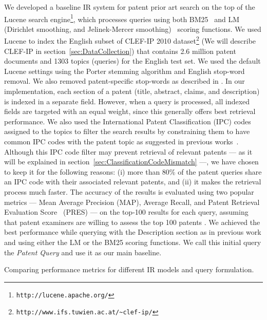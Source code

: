 We developed a baseline IR system for patent prior art search on the top of
the Lucene search engine\footnote{\texttt{http://lucene.apache.org/}}, which processes queries using both BM25~\citep{Robertson1993} and LM (Dirichlet
smoothing, and Jelinek-Mercer smoothing)~\citep{zhai2004study} scoring functions. %
We used Lucene to index the English subset of CLEF-IP 2010 dataset\footnote{\texttt{http://www.ifs.tuwien.ac.at/\textasciitilde{}clef-ip/}} 
(We will describe CLEF-IP in section~\ref{sec:DataCollection}) that contains 2.6 million patent documents and 1303 topics (queries) for the English test set.
We used the default Lucene settings using the Porter stemming algorithm \cite{Porter1980} and English stop-word removal. 
We also removed patent-specific stop-words as described in \cite{magdy2012toward}.
In
our implementation, each section of a patent (title, abstract, claims,
and description) is indexed in a separate field. However, when a query 
is processed, all indexed fields are targeted with an equal weight, since this generally
offers best retrieval performance. We also used the International
Patent Classification (IPC) codes assigned to the topics to filter
the search results by constraining them to have common IPC codes with
the patent topic as suggested in previous works~\citep{lopez2010patatras}.
Although this IPC code filter may prevent retrieval of relevant patents 
--- as it will be explained in section~\ref{sec:ClassificationCodeMismatch} ---, we
have chosen to keep it for the following reasons: (i) more than 80\%
of the patent queries share an IPC code with their associated relevant
patents, and (ii) it makes the retrieval process much faster. The accuracy of the results is evaluated 
using two popular metrics --- Mean Average Precision (MAP), Average Recall, and Patent Retrieval Evaluation 
Score~\citep{magdy2012toward} (PRES) --- on the top-100 results for each query, assuming that patent examiners 
are willing to assess the top 100 patents \citep{joho2010survey}. 
We achieved the best performance while querying with the Description
section as in previous work \citep{xue2009transforming} and using
either the LM or the BM25 scoring functions. We call this initial
query the \textit{Patent Query} and use it as our main baseline.
\begin{table*}[htpb]
  \begin{center}
  \caption{Comparing performance metrics for different IR models and query formulation.}
   
  \label{tab:IRmodels_Sections}
  \end{center}  
\end{table*}
\FloatBarrier 
\noindent

